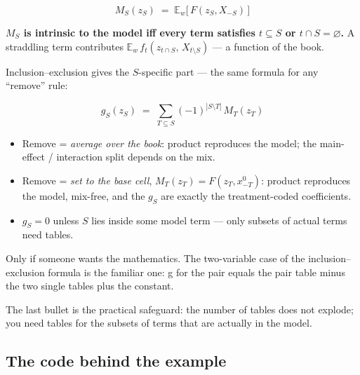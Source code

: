 \documentclass[
  letterpaper,
  DIV=11,
  numbers=noendperiod]{scrartcl}
\providecommand{\tightlist}{%
  \setlength{\itemsep}{0pt}\setlength{\parskip}{0pt}}
\begin{document}
\[
M_S(z_S) \;=\; \mathbb{E}_w\big[\,F(z_S, X_{-S})\,\big]
\]

\textbf{\(M_S\) is intrinsic to the model iff every term satisfies
\(t \subseteq S\) or \(t \cap S = \varnothing\).} A straddling term
contributes \(\mathbb{E}_w\, f_t(z_{t \cap S},\, X_{t \setminus S})\)
--- a function of the book.

Inclusion--exclusion gives the \(S\)-specific part --- the same formula
for any ``remove'' rule:

\[
g_S(z_S) \;=\; \sum_{T \subseteq S} (-1)^{|S \setminus T|}\, M_T(z_T)
\]

\begin{itemize}
\tightlist
\item
  Remove = \emph{average over the book}: product reproduces the model;
  the main-effect / interaction split depends on the mix.
\item
  Remove = \emph{set to the base cell}, \(M_T(z_T) = F(z_T, x^0_{-T})\):
  product reproduces the model, mix-free, and the \(g_S\) are exactly
  the treatment-coded coefficients.
\item
  \(g_S = 0\) unless \(S\) lies inside some model term --- only subsets
  of actual terms need tables.
\end{itemize}

Only if someone wants the mathematics. The two-variable case of the
inclusion--exclusion formula is the familiar one: g for the pair equals
the pair table minus the two single tables plus the constant.

The last bullet is the practical safeguard: the number of tables does
not explode; you need tables for the subsets of terms that are actually
in the model.

\subsection{The code behind the example}\label{code}
\end{document}
